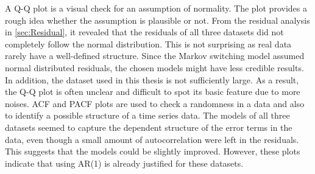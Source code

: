 A Q-Q plot is a visual check for an assumption of normality. The plot
provides a rough idea whether the assumption is plausible or not.
From the residual analysis in \ref{sec:Residual}, it revealed that
the residuals of all three datasets did not completely follow the
normal distribution. This is not surprising as real data rarely have
a well-defined structure. Since the Markov switching model assumed
normal distributed residuals, the chosen models might have less credible
results. In addition, the dataset used in this thesis is not sufficiently
large. As a result, the Q-Q plot is often unclear and difficult to
spot its basic feature due to more noises. ACF and PACF plots are
used to check a randomness in a data and also to identify a possible
structure of a time series data. The models of all three datasets
seemed to capture the dependent structure of the error terms in the
data, even though a small amount of autocorrelation were left in the
residuals. This suggests that the models could be slightly improved.
However, these plots indicate that using AR(1) is already justified
for these datasets. %
\begin{comment}
The assumption of a normally distributed residuals is justified for
software release L16B.

If the residuals appear to behave randomly, it suggests that the model
fits the data well.

randomness tends to obscure the actual behavior especially with small
data

Furthermore, the model is able to capture the pattern of data rather
well.

The model seems to capture the dependent structure of the error terms
in the time series, except for the reported significant lag. 

heavy tail = high variance

independent of noise terms

There is an outlier in the residuals (2004:Q4) which suggests there
was something unusual happening in that quarter. It would be worth
investigating that outlier to see if there were any unusual circumstances
or events that may have reduced beer production for the quarter.

The remaining residuals show that the model has captured the patterns
in the data quite well, although there is a small amount of autocorrelation
left in the residuals (seen in the significant spike in the ACF plot).
This suggests that the model can be slightly improved, although it
is unlikely to make much difference to the resulting forecasts.
\end{comment}

